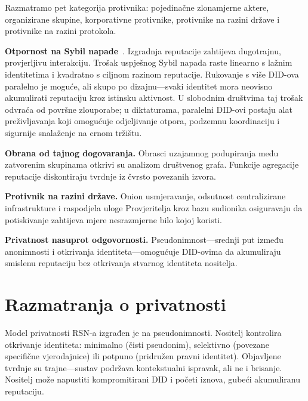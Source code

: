 \documentclass[11pt,a4paper,twocolumn]{article}
\begin{document}
Razmatramo pet kategorija protivnika: pojedinačne zlonamjerne aktere, organizirane skupine, korporativne protivnike, protivnike na razini države i protivnike na razini protokola.

\textbf{Otpornost na Sybil napade}~\cite{douceur2002}. Izgradnja reputacije zahtijeva dugotrajnu, provjerljivu interakciju. Trošak uspješnog Sybil napada raste linearno s lažnim identitetima i kvadratno s ciljnom razinom reputacije. Rukovanje s više DID-ova paralelno je moguće, ali skupo po dizajnu---svaki identitet mora neovisno akumulirati reputaciju kroz istinsku aktivnost. U slobodnim društvima taj trošak odvraća od površne zlouporabe; u diktaturama, paralelni DID-ovi postaju alat preživljavanja koji omogućuje odjeljivanje otpora, podzemnu koordinaciju i sigurnije snalaženje na crnom tržištu.

\textbf{Obrana od tajnog dogovaranja.} Obrasci uzajamnog podupiranja među zatvorenim skupinama otkrivi su analizom društvenog grafa. Funkcije agregacije reputacije diskontiraju tvrdnje iz čvrsto povezanih izvora.

\textbf{Protivnik na razini države.} Onion usmjeravanje, odsutnost centralizirane infrastrukture i raspodjela uloge Provjeritelja kroz bazu sudionika osiguravaju da potiskivanje zahtijeva mjere nesrazmjerne bilo kojoj koristi.

\textbf{Privatnost nasuprot odgovornosti.} Pseudonimnost---srednji put između anonimnosti i otkrivanja identiteta---omogućuje DID-ovima da akumuliraju smislenu reputaciju bez otkrivanja stvarnog identiteta nositelja.

\section{Razmatranja o privatnosti}

Model privatnosti RSN-a izgrađen je na pseudonimnosti. Nositelj kontrolira otkrivanje identiteta: minimalno (čisti pseudonim), selektivno (povezane specifične vjerodajnice) ili potpuno (pridružen pravni identitet). Objavljene tvrdnje su trajne---sustav podržava kontekstualni ispravak, ali ne i brisanje. Nositelj može napustiti kompromitirani DID i početi iznova, gubeći akumuliranu reputaciju.

\end{document}
